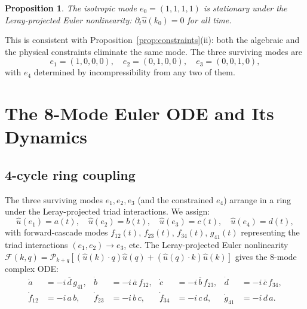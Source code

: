 \documentclass[reqno,10pt]{amsart}
\theoremstyle{plain}
\newtheorem{proposition}[theorem]{Proposition}
\theoremstyle{definition}
\begin{document}
\begin{proposition}\label{prop:isotropic}
  The isotropic mode $e_0 = (1,1,1,1)$ is stationary under the Leray-projected
  Euler nonlinearity: $\partial_t \hat{u}(k_0) = 0$ for all time.
\end{proposition}

This is consistent with Proposition~\ref{prop:constraints}(ii): both the
algebraic and the physical constraints eliminate the same mode.
The three surviving modes are
\begin{equation}\label{eq:seeds}
  e_1 = (1,0,0,0),\quad e_2 = (0,1,0,0),\quad e_3 = (0,0,1,0),
\end{equation}
with $e_4$ determined by incompressibility from any two of them.

\section{The 8-Mode Euler ODE and Its Dynamics}\label{sec:ode}

\subsection{4-cycle ring coupling}

The three surviving modes $e_1,e_2,e_3$ (and the constrained $e_4$) arrange
in a ring under the Leray-projected triad interactions.  We assign:
\[
  \hat{u}(e_1) = a(t),\quad \hat{u}(e_2) = b(t),\quad
  \hat{u}(e_3) = c(t),\quad \hat{u}(e_4) = d(t),
\]
with forward-cascade modes
$f_{12}(t)$, $f_{23}(t)$, $f_{34}(t)$, $g_{41}(t)$
representing the triad interactions $(e_1,e_2) \to e_3$, etc.
The Leray-projected Euler nonlinearity
$\mathcal{F}(k,q) = \mathcal{P}_{k+q}[(\hat{u}(k)\cdot q)\hat{u}(q) +
                                        (\hat{u}(q)\cdot k)\hat{u}(k)]$
gives the 8-mode complex ODE:
\begin{equation}\label{eq:ode}
\begin{aligned}
  \dot{a} &= -i\,\overline{d}\, g_{41}, &
  \dot{b} &= -i\,\overline{a}\, f_{12}, &
  \dot{c} &= -i\,\overline{b}\, f_{23}, &
  \dot{d} &= -i\,\overline{c}\, f_{34},\\
  \dot{f}_{12} &= -i\,a\,b, &
  \dot{f}_{23} &= -i\,b\,c, &
  \dot{f}_{34} &= -i\,c\,d, &
  \dot{g}_{41} &= -i\,d\,a.
\end{aligned}
\end{equation}
\end{document}
